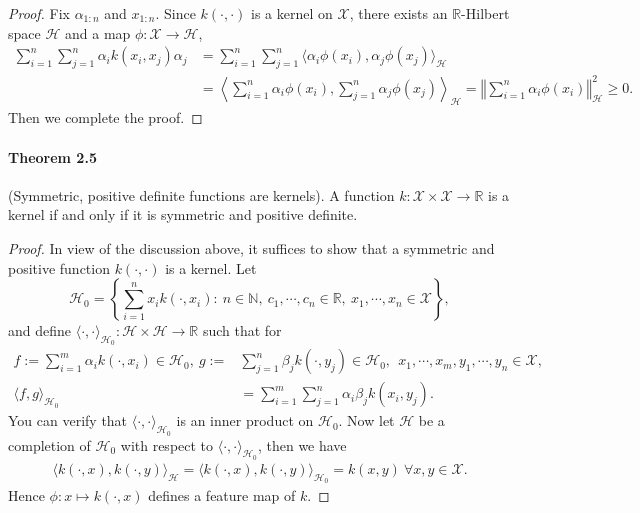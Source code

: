 \documentclass{article}
\begin{document}
\begin{proof}
Fix $\alpha_{1:n}$ and $x_{1:n}$. Since $k(\cdot,\cdot)$ is a kernel on $\mathcal{X}$, there exists an $\mathbb{R}$-Hilbert space $\mathcal{H}$ and a map $\phi:\mathcal{X}\to\mathcal{H}$,
\begin{align*}\sum_{i=1}^n\sum_{j=1}^n \alpha_i k(x_i,x_j)\alpha_j &= \sum_{i=1}^n\sum_{j=1}^n \langle\alpha_i\phi(x_i), \alpha_j\phi(x_j)\rangle_\mathcal{H} \\
&= \left\langle\sum_{i=1}^n\alpha_i\phi(x_i), \sum_{j=1}^n\alpha_j\phi(x_j)\right\rangle_\mathcal{H} = \left\Vert\sum_{i=1}^n\alpha_i\phi(x_i)\right\Vert_\mathcal{H}^2\geq 0.\tag{2.3}
\end{align*}
Then we complete the proof.
\end{proof}

\paragraph{Theorem 2.5} (Symmetric, positive definite functions are kernels). A function $k: \mathcal{X}\times\mathcal{X}\to\mathbb{R}$ is a kernel if and only if it is symmetric and positive definite.

\begin{proof}
In view of the discussion above, it suffices to show that a symmetric and positive function $k(\cdot,\cdot)$ is a kernel. Let
\begin{equation*}
	\mathcal{H}_0 = \left\lbrace\sum_{i=1}^n x_ik(\cdot,x_i):\ n\in\mathbb{N},\ c_1,\cdots,c_n\in\mathbb{R},\ x_1,\cdots,x_n\in\mathcal{X}\right\rbrace,\tag{2.4}
\end{equation*}
and define $\langle\cdot,\cdot\rangle_{\mathcal{H}_0}: \mathcal{H}\times\mathcal{H}\to\mathbb{R}$ such that for 
\begin{align*}
	f:=\sum_{i=1}^m\alpha_ik(\cdot, x_i) \in\mathcal{H}_0,\ g:=&\sum_ {j=1}^n\beta_jk(\cdot, y_j)\in\mathcal{H}_0,\ \ x_1,\cdots,x_m,y_1,\cdots,y_n\in\mathcal{X},\tag{2.5}\\
	\langle f,g\rangle_{\mathcal{H}_0}&=\sum_{i=1}^m\sum_ {j=1}^n\alpha_i\beta_jk(x_i, y_j).\tag{2.6}
\end{align*}
You can verify that $\langle\cdot,\cdot\rangle_{\mathcal{H}_0}$ is an inner product on $\mathcal{H}_ 0$. Now let $\mathcal{H}$ be a completion of $\mathcal{H_ 0}$ with respect to $\langle\cdot,\cdot\rangle_{\mathcal{H}_ 0}$, then we have
\begin{align*}
	\langle k(\cdot, x), k(\cdot,y)\rangle_{\mathcal{H}} = \langle k(\cdot, x), k(\cdot,y)\rangle_{\mathcal{H}_0} = k(x,y)\ \forall x,y\in\mathcal{X}.\tag{2.7}
\end{align*}
Hence $\phi:x\mapsto k(\cdot,x)$ defines a feature map of $k$.
\end{proof}
\end{document}

